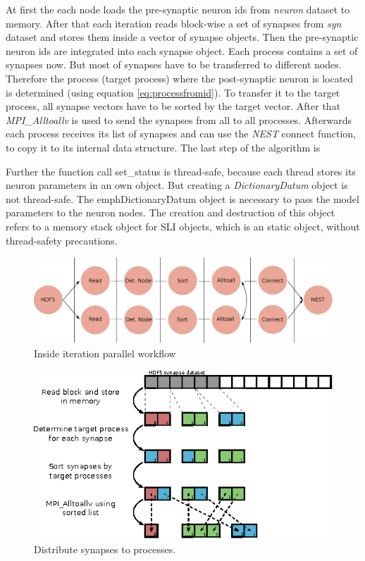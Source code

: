 At first the each node loads the pre-synaptic neuron ids from \emph{neuron} dataset to memory.
After that each iteration reads block-wise a set of synapses from \emph{syn} dataset and
stores them inside a vector of synapse objects.
Then the pre-synaptic neuron ids are integrated into each synapse object.
Each process contains a set of synapses now.
But most of synapses have to be transferred to different nodes.
Therefore the process (target process) where the post-synaptic neuron is located is determined (using equation \ref{eq:processfromid}).
To transfer it to the target process, all synapse vectors have to be sorted by the target vector.
After that \emph{MPI\_Alltoallv} is used to send the synapses from all to all processes.
Afterwards each process receives its list of synapses and can use the \emph{NEST} connect function, to copy it to its internal data structure.
The last step of the algorithm is 

Further the function call set\_{}status is thread-safe, because each
thread stores its neuron parameters in an own object.
But creating a \emph{DictionaryDatum} object is not thread-safe.
The emph{DictionaryDatum} object is necessary to pass the model
parameters to the neuron nodes. The creation and destruction of this
object refers to a memory stack object for SLI objects, which is an static object,
without thread-safety precautions. 


\begin{figure}[ht!]
\centering
\includegraphics[scale=0.4]{pictures/Connect_inside_iteration.eps}
\caption{Inside iteration parallel workflow}
\label{Algparts}
\end{figure}

\begin{figure}[ht!]
\centering
\includegraphics[scale=2.0]{pictures/import_syn_vis.eps}
\caption{Distribute synapses to processes.}
\end{figure}

